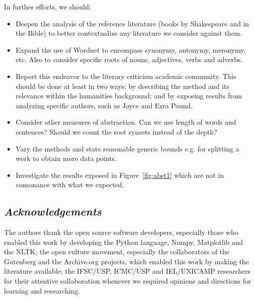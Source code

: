 \documentclass[12pt,fleqn]{article}
\begin{document}
In further efforts, we should:
\begin{itemize}
    \item Deepen the analysis of the reference literature (books by Shakespeare and in the Bible)
        to better contextualize any literature we consider against them.
    \item Expand the use of Wordnet to encompass synonymy, antonymy, meronymy, etc.
        Also to consider specific roots of nouns, adjectives, verbs and adverbs.
    \item Report this endeavor to the literary criticism academic community.
        This should be done at least in two ways: by describing the method and its relevance
        within the humanities background;
        and by exposing results from analyzing specific authors, such as Joyce and Ezra Pound.
    \item Consider other measures of abstraction.
        Can we use length of words and sentences?
        Should we count the root synsets instead of the depth?
    \item Vary the methods and state reasonable generic bounds e.g. for splitting a work to
        obtain more data points.
    \item Investigate the results exposed in Figure~\ref{fig:abst1} which are not in consonance with what we expected.
\end{itemize}

\subsection*{\textit{Acknowledgements}}
The authors thank the open source software developers,
especially those who enabled this work by developing
the Python language, Numpy, Matplotlib and the NLTK;
the open culture movement, especially the collaborators
of the Gutenberg and the Archive.org projects, which
enabled this work by making the literature available;
the IFSC/USP, ICMC/USP and IEL/UNICAMP researchers for their attentive
collaboration whenever we required opinions and directions for learning and researching.
\end{document}
